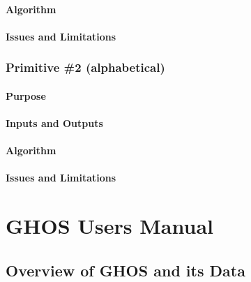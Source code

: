 \documentclass[letterpaper,10pt,english]{sphinxmanual}
\begin{document}
\subsubsection{Algorithm}
\label{F2/primitives_pages/primitive1:algorithm}

\subsubsection{Issues and Limitations}
\label{F2/primitives_pages/primitive1:issues-and-limitations}

\subsection{Primitive \#2  (alphabetical)}
\label{F2/primitives_pages/primitive2:primitive-2-alphabetical}\label{F2/primitives_pages/primitive2::doc}\label{F2/primitives_pages/primitive2:f2-primitive-2}

\subsubsection{Purpose}
\label{F2/primitives_pages/primitive2:purpose}

\subsubsection{Inputs and Outputs}
\label{F2/primitives_pages/primitive2:inputs-and-outputs}

\subsubsection{Algorithm}
\label{F2/primitives_pages/primitive2:algorithm}

\subsubsection{Issues and Limitations}
\label{F2/primitives_pages/primitive2:issues-and-limitations}

\chapter{GHOS Users Manual}
\label{GHOScontents::doc}\label{GHOScontents:ghos-users-manual}\label{GHOScontents:id1}

\section{Overview of GHOS and its Data}
\label{GHOS/instrument:overview-of-ghos-and-its-data}\label{GHOS/instrument:ghos-instrument-overview}\label{GHOS/instrument::doc}
\end{document}
